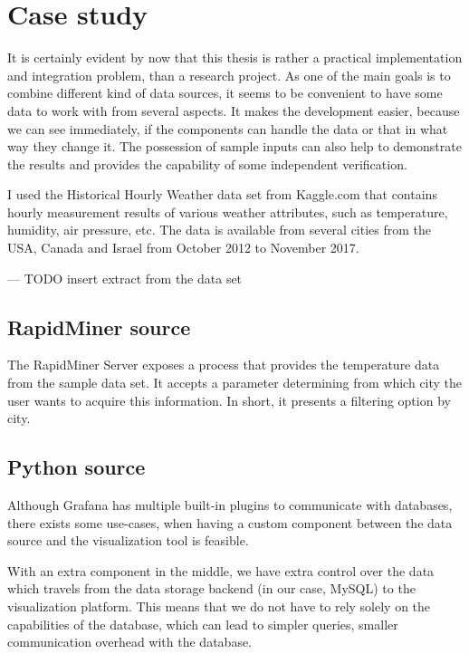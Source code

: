 \chapter{Case study}

It is certainly evident by now that this thesis is rather a practical implementation and integration problem, than a research project. As one of the main goals is to combine different kind of data sources, it seems to be convenient to have some data to work with from several aspects. It makes the development easier, because we can see immediately, if the components can handle the data or that in what way they change it. The possession of sample inputs can also help to demonstrate the results and provides the capability of some independent verification.

I used the Historical Hourly Weather data set from Kaggle.com that contains hourly measurement results of various weather attributes, such as temperature, humidity, air pressure, etc. The data is available from several cities from the USA, Canada and Israel from October 2012 to November 2017.

\begin{center}
	--- TODO insert extract from the data set
\end{center}

\section{RapidMiner source}

The RapidMiner Server exposes a process that provides the temperature data from the sample data set. It accepts a parameter determining from which city the user wants to acquire this information. In short, it presents a filtering option by city.

\section{Python source}

Although Grafana has multiple built-in plugins to communicate with databases, there exists some use-cases, when having a custom component between the data source and the visualization tool is feasible.

With an extra component in the middle, we have extra control over the data which travels from the data storage backend (in our case, MySQL) to the visualization platform. This means that we do not have to rely solely on the capabilities of the database, which can lead to simpler queries, smaller communication overhead with the database.

